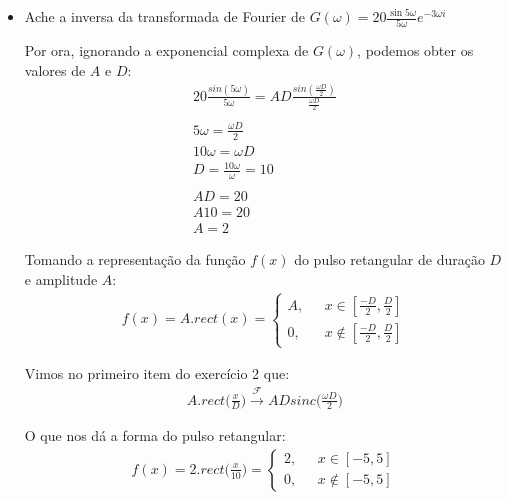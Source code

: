 \documentclass[12pt]{article}
\begin{document}
\begin{itemize}
\begin{itemize}
\item Ache a inversa da transformada de Fourier de $G(\omega) =
  20\frac{\sin 5\omega}{5\omega}e^{-3\omega i}$

Por ora, ignorando a exponencial complexa de $G(\omega)$, podemos obter os valores de $A$ e $D$:
\begin{align*}
    20\frac{sin(5\omega)}{5\omega} = AD\frac{sin(\frac{\omega D}{2})}{\frac{\omega D}{2}} \\
    \\ 5\omega = \frac{\omega D}{2} \\
    10\omega = \omega D \\
    D = \frac{10\omega}{\omega} = 10 \\
    \\ AD = 20 \\
    A10 = 20 \\
    A = 2
\end{align*}

Tomando a representação da função $f(x)$ do pulso retangular de duração $D$ e amplitude $A$:
\begin{align*}
f(x) = A . rect(x) = \left\{ \begin{array}{rl}
 A, &\mbox{ $x \in  [\frac{-D}{2}, \frac{D}{2}]$} \\
 0, &\mbox{ $x \notin [\frac{-D}{2}, \frac{D}{2}]$}
       \end{array} \right.
\end{align*}

Vimos no primeiro item do exercício 2 que:
\begin{align*}
 A . rect\bigg(\frac{x}{D}\bigg) \xrightarrow{\mathscr{F}} ADsinc \bigg(\frac{\omega D}{2}\bigg)
\end{align*}

O que nos dá a forma do pulso retangular:
\begin{align*}
f(x) = 2 . rect\bigg(\frac{x}{10}\bigg) = \left\{ \begin{array}{rl} 
 2, &\mbox{ $x \in  [-5, 5]$} \\
 0, &\mbox{ $x \notin [-5, 5]$}
       \end{array} \right.
\end{align*}


\end{itemize}
\end{itemize}
\end{document}

